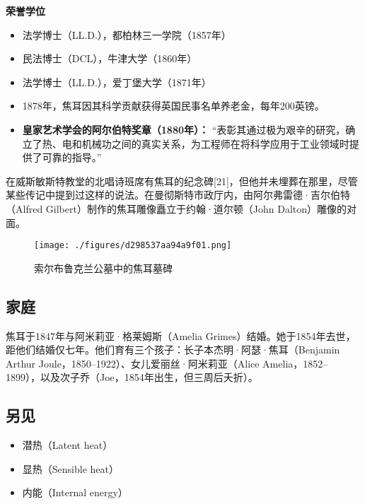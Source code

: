 \textbf{荣誉学位} 
\begin{itemize}
\item 法学博士（LL.D.），都柏林三一学院（1857年）  
\item 民法博士（DCL），牛津大学（1860年）  
\item 法学博士（LL.D.），爱丁堡大学（1871年）  
\end{itemize}

\begin{itemize}
\item 1878年，焦耳因其科学贡献获得英国民事名单养老金，每年200英镑。  
\item \textbf{皇家艺术学会的阿尔伯特奖章（1880年）：} 
“表彰其通过极为艰辛的研究，确立了热、电和机械功之间的真实关系，为工程师在将科学应用于工业领域时提供了可靠的指导。” 
\end{itemize} 

在威斯敏斯特教堂的北唱诗班席有焦耳的纪念碑[21]，但他并未埋葬在那里，尽管某些传记中提到过这样的说法。在曼彻斯特市政厅内，由阿尔弗雷德·吉尔伯特（Alfred Gilbert）制作的焦耳雕像矗立于约翰·道尔顿（John Dalton）雕像的对面。
\begin{figure}[ht]
\centering
\texttt{[image: ./figures/d298537aa94a9f01.png]}
\caption{索尔布鲁克兰公墓中的焦耳墓碑} \label{fig_JR_9}
\end{figure}
\subsection{家庭}
焦耳于1847年与阿米莉亚·格莱姆斯（Amelia Grimes）结婚。她于1854年去世，距他们结婚仅七年。他们育有三个孩子：长子本杰明·阿瑟·焦耳（Benjamin Arthur Joule，1850–1922）、女儿爱丽丝·阿米莉亚（Alice Amelia，1852–1899），以及次子乔（Joe，1854年出生，但三周后夭折）。
\subsection{另见}  
\begin{itemize}
\item 潜热（Latent heat）  
\item 显热（Sensible heat）  
\item 内能（Internal energy）
\end{itemize}  

